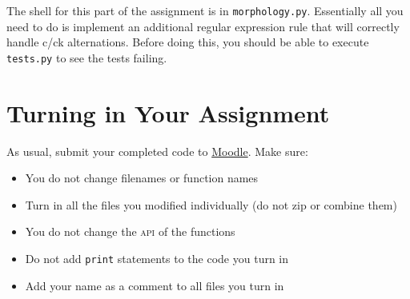 \documentclass[11pt]{article}
\begin{document}
The shell for this part of the assignment is in
\texttt{morphology.py}. Essentially all you need to do is implement an
additional regular expression rule that will correctly handle c/ck
alternations. Before doing this, you should be able to execute
\texttt{tests.py} to see the tests failing.



\section*{Turning in Your Assignment}

As usual, submit your completed code to
\href{https://moodle.cs.colorado.edu/course/view.php?id=161}{Moodle}.
Make sure:
\begin{itemize}
  \item You do not change filenames or function names
  \item Turn in all the files you modified individually (do not zip or
    combine them)
  \item You do not change the \textsc{api} of the functions
  \item Do not add \texttt{print} statements to the code you turn in
  \item Add your name as a comment to all files you turn in
\end{itemize}
\end{document}
